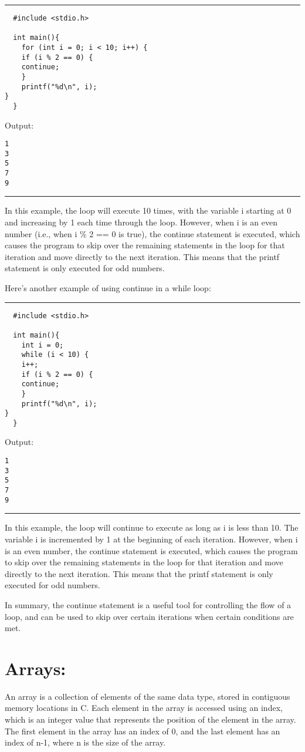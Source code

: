 \documentclass[a4paper]{article}
\begin{document}
\noindent\rule{\textwidth}{0.5pt}
\begin{verbatim}
  #include <stdio.h>

  int main(){
    for (int i = 0; i < 10; i++) {
    if (i % 2 == 0) {
	continue;
    }
    printf("%d\n", i);
}
  }
\end{verbatim}
Output:
\begin{verbatim}
1
3
5
7
9
\end{verbatim}

\noindent\rule{\textwidth}{0.5pt}
In this example, the loop will execute 10 times, with the variable i starting at
0 and increasing by 1 each time through the loop. However, when i is an even
number (i.e., when i \% 2 == 0 is true), the continue statement is executed,
which causes the program to skip over the remaining statements in the loop for
that iteration and move directly to the next iteration. This means that the
printf statement is only executed for odd numbers.


Here's another example of using continue in a while loop:

\noindent\rule{\textwidth}{0.5pt}
\begin{verbatim}
  #include <stdio.h>

  int main(){
    int i = 0;
    while (i < 10) {
    i++;
    if (i % 2 == 0) {
	continue;
    }
    printf("%d\n", i);
}
  }
\end{verbatim}
Output:
\begin{verbatim}
1
3
5
7
9
\end{verbatim}

\noindent\rule{\textwidth}{0.5pt}
In this example, the loop will continue to execute as long as i is less
than 10. The variable i is incremented by 1 at the beginning of each
iteration. However, when i is an even number, the continue statement is
executed, which causes the program to skip over the remaining statements in the
loop for that iteration and move directly to the next iteration. This means that
the printf statement is only executed for odd numbers.


In summary, the continue statement is a useful tool for controlling the flow of
a loop, and can be used to skip over certain iterations when certain conditions
are met.

\section{Arrays:}
\label{sec:orgc4fc6bb}
An array is a collection of elements of the same data type, stored in contiguous
memory locations in C. Each element in the array is accessed using an index,
which is an integer value that represents the position of the element in the
array. The first element in the array has an index of 0, and the last element
has an index of n-1, where n is the size of the array.
\end{document}
